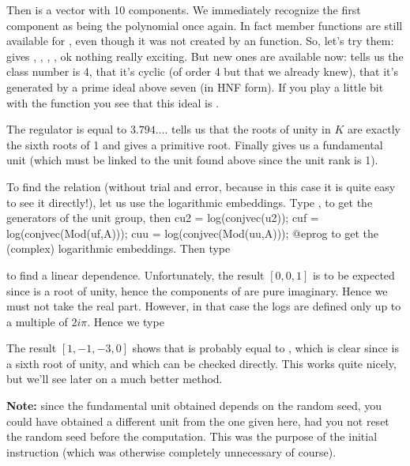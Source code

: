 Then  is a vector with 10 components. We immediately recognize the first
component as being the polynomial  once again. In fact member
functions are still available for , even though it was not created
by an  function. So, let's try them:  gives ,
, , , ok nothing really exciting. But new
ones are available now:  tells us the class number is 4,
 that it's cyclic (of order 4 but that we already knew),
 that it's generated by a prime ideal above seven (in HNF form). If
you play a little bit with the  function you see that this ideal
is .

 The regulator  is equal to $3.794\dots$.  tells us that
the roots of unity in $K$ are exactly the sixth roots of 1 and gives a
primitive root. Finally  gives us a fundamental unit (which must be
linked to the unit  found above since the unit rank is 1).

To find the relation (without trial and error, because in this case it is
quite easy to see it directly!), let us use the logarithmic embeddings. Type
,  to get the generators of the unit
group, then
\bprog
cu2 = log(conjvec(u2));
cuf = log(conjvec(Mod(uf,A)));
cuu = log(conjvec(Mod(uu,A)));
@eprog\noindent
to get the (complex) logarithmic embeddings. Then type


\noindent to find a linear dependence. Unfortunately, the result $[0,0,1]$ is
to be expected since  is a root of unity, hence the components of
 are pure imaginary. Hence we must not take the real part. However,
in that case the logs are defined only up to a multiple of $2i\pi$. Hence we
type


The result $[1,-1,-3,0]$ shows that  is probably equal to
, which is clear since  is a sixth root of unity,
and which can be checked directly. This works quite nicely, but we'll see
later on a much better method.

{\bf Note:} since the fundamental unit obtained depends on the random
seed, you could have obtained a different unit from the one given here, had
you not reset the random seed before the computation. This was the purpose
of the initial  instruction (which was otherwise completely
unnecessary of course). \medskip

